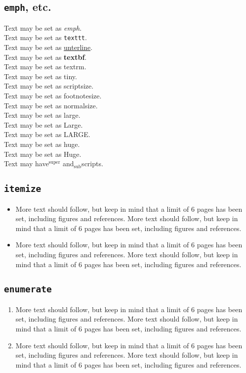 \documentclass[box,accept]{acmconf}
\begin{document}
\subsection{\texttt{emph}, etc.}
Text may be set as \emph{emph}.\\
Text may be set as \texttt{texttt}.\\
Text may be set as \underline{unterline}.\\
Text may be set as \textbf{textbf}.\\
Text may be set as \textrm{textrm}.\\
Text may be set as {\tiny tiny}.\\
Text may be set as {\scriptsize scriptsize}.\\
Text may be set as {\footnotesize footnotesize}.\\
Text may be set as {\normalfont normalsize}.\\
Text may be set as {\large large}.\\
Text may be set as {\Large Large}.\\
Text may be set as {\LARGE LARGE}.\\
Text may be set as {\huge huge}.\\
Text may be set as {\Huge Huge}.\\
Text may have$^{\textrm{super}}$ and$_{\textrm{sub}}$scripts.

\subsection{\texttt{itemize}}
\begin{itemize}
\item More text should follow, but keep in mind that a limit of 6
     pages has been set, including figures and references.  More text
     should follow, but keep in mind that a limit of 6 pages has been
     set, including figures and references.
\item More text should follow, but keep in mind that a limit of 6
     pages has been set, including figures and references.  More text
     should follow, but keep in mind that a limit of 6 pages has been
     set, including figures and references.
\end{itemize}

\subsection{\texttt{enumerate}}
\begin{enumerate}
\item More text should follow, but keep in mind that a limit of 6
     pages has been set, including figures and references.  More text
     should follow, but keep in mind that a limit of 6 pages has been
     set, including figures and references.
\item More text should follow, but keep in mind that a limit of 6
     pages has been set, including figures and references.  More text
     should follow, but keep in mind that a limit of 6 pages has been
     set, including figures and references.
\end{enumerate}
\end{document}
